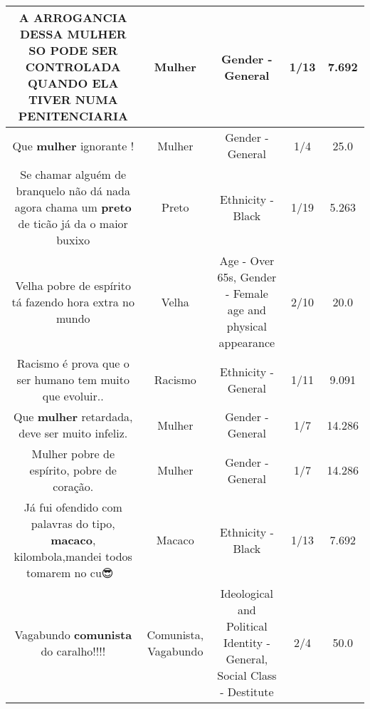 \documentclass[11pt]{article}
\newlength\mylength
\begin{document}
\begin{center}
\begin{longtable}{|C{.65\mylength}|C{.30\mylength}|C{.12\mylength}|C{.12\mylength}|C{.12\mylength}|}
  \small A ARROGANCIA  DESSA \textbf{MULHER}  SO  PODE  SER  CONTROLADA  QUANDO ELA  TIVER  NUMA  PENITENCIARIA\normalsize   & Mulher & Gender - General & 1/13 & 7.692 \\  \hline
  \small Que \textbf{mulher} ignorante !\normalsize   & Mulher & Gender - General & 1/4 & 25.0 \\  \hline
  \small Se chamar alguém de branquelo não dá nada agora chama um \textbf{preto} de ticão já da o maior buxixo\normalsize   & Preto & Ethnicity - Black & 1/19 & 5.263 \\  \hline
  \small Velha pobre de espírito tá fazendo hora extra no mundo\normalsize   & Velha & Age - Over 65s, Gender - Female age and physical appearance & 2/10 & 20.0 \\  \hline
  \small Racismo é prova que o ser humano tem muito que evoluir..\normalsize   & Racismo & Ethnicity - General & 1/11 & 9.091 \\  \hline
  \small Que \textbf{mulher} retardada, deve ser muito infeliz.\normalsize   & Mulher & Gender - General & 1/7 & 14.286 \\  \hline
  \small Mulher pobre de espírito, pobre de coração.\normalsize   & Mulher & Gender - General & 1/7 & 14.286 \\  \hline
  \small Já fui ofendido com palavras do tipo, \textbf{macaco}, kilombola,mandei todos tomarem no cu😎👏🏽\normalsize   & Macaco & Ethnicity - Black & 1/13 & 7.692 \\  \hline
  \small Vagabundo \textbf{comunista} do caralho!!!!\normalsize   & Comunista, Vagabundo & Ideological and Political Identity - General, Social Class - Destitute & 2/4 & 50.0 \\  \hline

\end{longtable}
\end{center}
\end{document}
